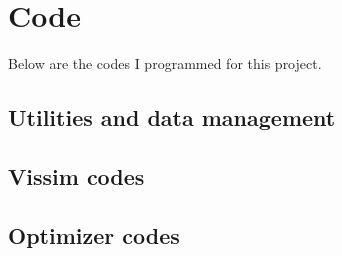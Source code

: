\section{Code}
\label{code}
Below are the codes I programmed for this project.

\subsection{Utilities and data management}






\subsection{Vissim codes}













\subsection{Optimizer codes}




